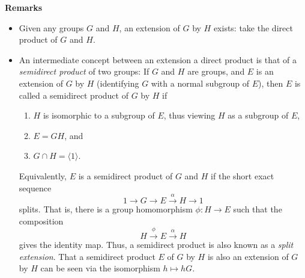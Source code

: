 \documentclass[12pt]{article}
\begin{document}
\textbf{Remarks}
\begin{itemize}
\item Given any groups $G$ and $H$, an extension of $G$ by $H$
exists: take the direct product of $G$ and $H$.
\item An intermediate concept between an extension a direct product is that of a \emph{semidirect product} of two groups: If $G$ and $H$ are groups, and $E$
is an extension of $G$ by $H$ (identifying $G$ with a normal subgroup
of $E$), then $E$ is called a semidirect product of $G$ by $H$ if
\begin{enumerate}
\item $H$ is isomorphic to a subgroup of $E$, thus viewing $H$ as a
subgroup of $E$,
\item $E=GH$, and
\item $G\cap H=\langle1\rangle$.
\end{enumerate}
Equivalently, $E$ is a semidirect product of $G$ and $H$ if the
short exact sequence
$$1\longrightarrow G\longrightarrow E\stackrel{\alpha}{\longrightarrow} H\longrightarrow 1$$
splits.  That is, there is a group homomorphism $\phi\colon H\to E$ such
that the composition
$$H\stackrel{\phi}{\longrightarrow}E\stackrel{\alpha}{\longrightarrow}H$$
gives the identity map.
Thus, a semidirect product is also known as a \emph{split
extension}.  That a semidirect product $E$ of $G$ by $H$ is also an extension of $G$ by $H$ can be seen via the isomorphism $h\mapsto hG$.  


\end{itemize}
\end{document}
